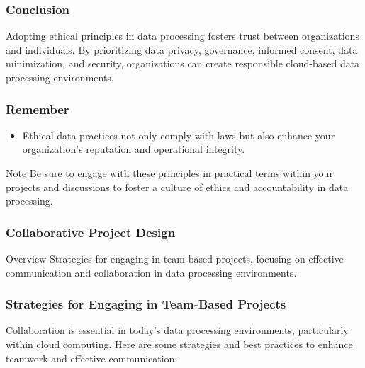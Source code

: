 \documentclass[aspectratio=169]{beamer}
\begin{document}
\begin{frame}[fragile]
    \frametitle{Conclusion}
    Adopting ethical principles in data processing fosters trust between organizations and individuals. By prioritizing data privacy, governance, informed consent, data minimization, and security, organizations can create responsible cloud-based data processing environments.
\end{frame}

\begin{frame}[fragile]
    \frametitle{Remember}
    \begin{itemize}
        \item Ethical data practices not only comply with laws but also enhance your organization’s reputation and operational integrity.
    \end{itemize}
    \begin{block}{Note}
        Be sure to engage with these principles in practical terms within your projects and discussions to foster a culture of ethics and accountability in data processing.
    \end{block}
\end{frame}

\begin{frame}[fragile]
  \frametitle{Collaborative Project Design}
  \begin{block}{Overview}
    Strategies for engaging in team-based projects, focusing on effective communication and collaboration in data processing environments.
  \end{block}
\end{frame}

\begin{frame}[fragile]
  \frametitle{Strategies for Engaging in Team-Based Projects}
  Collaboration is essential in today’s data processing environments, particularly within cloud computing. Here are some strategies and best practices to enhance teamwork and effective communication:
\end{frame}
\end{document}
